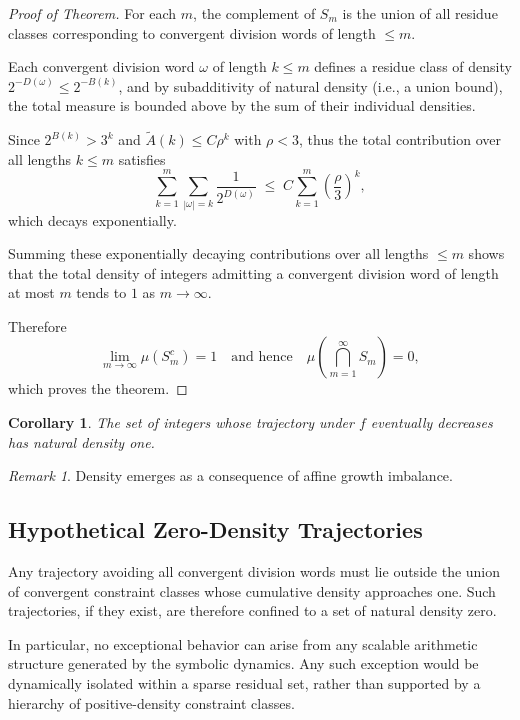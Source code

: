 \documentclass[12pt, oneside]{article}
\numberwithin{equation}{section}
\theoremstyle{definition}
\theoremstyle{plain}
\newtheorem{corollary}[theorem]{Corollary}
\theoremstyle{remark}
\newtheorem*{remark}{Remark}
\begin{document}
\begin{proof}[Proof of Theorem]
For each $m$, the complement of $S_m$ is the union of all residue classes
corresponding to convergent division words of length $\le m$.

Each convergent division word $\omega$ of length $k \le m$ defines a residue
class of density $2^{-D(\omega)} \le 2^{-B(k)}$, and by subadditivity of
natural density (i.e., a union bound), the total measure is bounded above by
the sum of their individual densities.

Since $2^{B(k)} > 3^k$ and $\widetilde A(k) \le C \rho^k$ with $\rho < 3$,
thus the total contribution over all lengths $k \le m$ satisfies
\[
\sum_{k=1}^{m} \sum_{|\omega|=k} \frac{1}{2^{D(\omega)}}
\;\le\;
C \sum_{k=1}^{m} \left(\frac{\rho}{3}\right)^k,
\]
which decays exponentially.

Summing these exponentially decaying contributions over all lengths $\le m$
shows that the total density of integers admitting a convergent division word
of length at most $m$ tends to $1$ as $m \to \infty$.

Therefore
\[
\lim_{m\to\infty} \mu(S_m^c) = 1
\quad\text{and hence}\quad
\mu\!\left(\bigcap_{m=1}^\infty S_m\right) = 0,
\]
which proves the theorem.
\end{proof}

\begin{corollary}
The set of integers whose trajectory under $f$ eventually decreases
has natural density one.
\end{corollary}

\begin{remark}
Density emerges as a consequence of affine growth imbalance.
\end{remark}

\subsection{Hypothetical Zero-Density Trajectories}

Any trajectory avoiding all convergent division words must lie outside
the union of convergent constraint classes whose cumulative density
approaches one. Such trajectories, if they exist, are therefore confined
to a set of natural density zero.

In particular, no exceptional behavior can arise from any scalable
arithmetic structure generated by the symbolic dynamics. Any such
exception would be dynamically isolated within a sparse residual set,
rather than supported by a hierarchy of positive-density constraint
classes.
\end{document}
